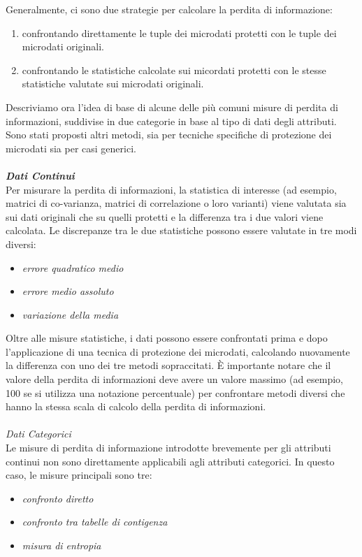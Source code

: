 Generalmente, ci sono due strategie per calcolare la perdita di informazione:
\begin{enumerate}[label=\textit{\roman*)}]
    \item confrontando direttamente le tuple dei microdati protetti con le tuple dei microdati originali.
    \item confrontando le statistiche calcolate sui micordati protetti con le stesse statistiche valutate sui microdati originali.
\end{enumerate}
Descriviamo ora l'idea di base di alcune delle più comuni misure di perdita di informazioni, suddivise in due categorie in base al tipo di dati degli attributi. Sono stati proposti altri metodi, sia per tecniche specifiche di protezione dei microdati sia per casi generici.
\\
\\\textit{\textbf{Dati Continui}}
\\
Per misurare la perdita di informazioni, la statistica di interesse (ad esempio, matrici di co-varianza, matrici di correlazione o loro varianti) viene valutata sia sui dati originali che su quelli protetti e la differenza tra i due valori viene calcolata. Le discrepanze tra le due statistiche possono essere valutate in tre modi diversi: 
\begin{itemize}
    \item \textit{errore quadratico medio}
    \item \textit{errore medio assoluto}
    \item \textit{variazione della media}
\end{itemize}
Oltre alle misure statistiche, i dati possono essere confrontati prima e dopo l'applicazione di una tecnica di protezione dei microdati, calcolando nuovamente la differenza con uno dei tre metodi sopraccitati.
È importante notare che il valore della perdita di informazioni deve avere un valore massimo (ad esempio, 100 se si utilizza una notazione percentuale) per confrontare metodi diversi che hanno la stessa scala di calcolo della perdita di informazioni.
\\
\\\textit{Dati Categorici}
\\
Le misure di perdita di informazione introdotte brevemente per gli attributi continui non sono direttamente applicabili agli attributi categorici. In questo caso, le misure principali sono tre: 
\begin{itemize}
    \item \textit{confronto diretto}
    \item \textit{confronto tra tabelle di contigenza}
    \item \textit{misura di entropia}
\end{itemize}
